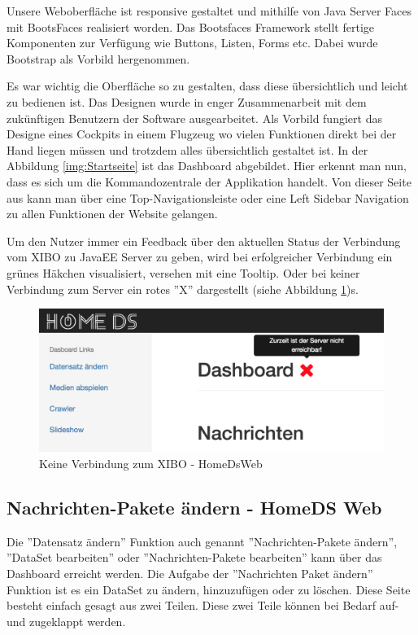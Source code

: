 Unsere Weboberfläche ist responsive gestaltet und mithilfe von Java Server Faces mit BootsFaces realisiert worden. Das Bootsfaces Framework stellt fertige Komponenten zur Verfügung wie Buttons, Listen, Forms etc. Dabei wurde Bootstrap als Vorbild hergenommen.

Es war wichtig die Oberfläche so zu gestalten, dass diese übersichtlich und leicht zu bedienen ist. Das Designen wurde in enger Zusammenarbeit mit dem zukünftigen Benutzern der Software ausgearbeitet. Als Vorbild fungiert das Designe eines Cockpits in einem Flugzeug wo vielen Funktionen direkt bei der Hand liegen müssen und trotzdem alles übersichtlich gestaltet ist. In der Abbildung \ref{img:Startseite} ist das Dashboard abgebildet. 
Hier erkennt man nun, dass es sich um die Kommandozentrale der Applikation handelt. Von dieser Seite aus kann man über eine Top-Navigationsleiste oder eine Left Sidebar Navigation zu allen Funktionen der Website gelangen. 

Um den Nutzer immer ein Feedback über den aktuellen Status der Verbindung vom XIBO zu JavaEE Server zu geben, wird bei erfolgreicher Verbindung ein grünes Häkchen visualisiert, versehen mit eine Tooltip. Oder bei keiner Verbindung zum Server ein rotes ''X'' dargestellt (siehe Abbildung  \ref{img:NoConnection})s.

\begin{figure}[H]
\includegraphics[width=1\textwidth]{images/08_HomeDsWeb/DashboardNoConnection.png}
\caption{Keine Verbindung zum XIBO - HomeDsWeb}
\label{img:NoConnection}
\end{figure}

\subsection{Nachrichten-Pakete ändern - HomeDS Web}\label{sec:homedswebdataset}
Die ''Datensatz ändern'' Funktion auch genannt ''Nachrichten-Pakete ändern'', ''DataSet bearbeiten'' oder ''Nachrichten-Pakete bearbeiten'' kann über das Dashboard erreicht werden.
Die Aufgabe der ''Nachrichten Paket ändern'' Funktion ist es ein DataSet zu ändern, hinzuzufügen oder zu löschen. Diese Seite besteht einfach gesagt aus zwei Teilen. Diese zwei Teile können bei Bedarf auf- und zugeklappt werden.

